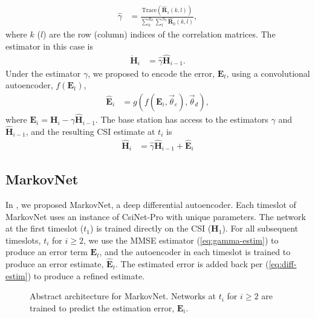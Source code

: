 \begin{align*}
	\hat \gamma &= \frac{\text{Trace}(\hat{\mathbf R}_1(k,l))}{\sum_k^{R_d}\sum_l^{N_b}\hat{\mathbf R}_0(k,l)},
\end{align*}
where $k$ ($l$) are the row (column) indices of the correlation matrices. The estimator in this case is 
\begin{align}
	\grave{\mathbf H}_i &= \hat\gamma \hat{\mathbf H}_{i-1} \label{eq:gamma-estim}.
\end{align}
Under the estimator $\gamma$, we proposed to encode the error, $\mathbf E_t$, using a convolutional autoencoder, $f(\mathbf E_t)$,
\begin{align*}
	\hat{\mathbf E}_i &= g(f(\mathbf E_i, \vec\theta_e), \vec\theta_d),
\end{align*}
where $\mathbf E_i = \mathbf H_i - \gamma\hat{\mathbf H}_{i-1}$. The base station has access to the estimators $\gamma$ and $\hat{\mathbf H}_{i-1}$, and the resulting CSI estimate at $t_i$ is
\begin{align}
	\hat{\mathbf H}_i &= \hat\gamma \hat{\mathbf H}_{i-1} + \hat{\mathbf{E}}_i \label{eq:diff-estim}
\end{align}

\subsection{MarkovNet}

In \cite{ref:Liu2020MarkovNet}, we proposed MarkovNet, a deep differential autoencoder. Each timeslot of MarkovNet uses an instance of CsiNet-Pro with unique parameters. The network at the first timeslot ($t_1$) is trained directly on the CSI ($\mathbf H_1$). For all subsequent timeslots, $t_i$ for $i \geq 2$, we use the MMSE estimator (\ref{eq:gamma-estim}) to produce an error term $\mathbf E_t$, and the autoencoder in each timeslot is trained to produce an error estimate, $\hat{\mathbf E}_t$. The estimated error is added back per (\ref{eq:diff-estim}) to produce a refined estimate.

\begin{figure}[!hbtp]
    \centering
    {
      \fontsize{6pt}{8pt}
      \def\svgwidth{0.8\columnwidth}
      
    }
    \caption{Abstract architecture for MarkovNet. Networks at $t_i$ for $i \geq 2$ are trained to predict the estimation error, $\mathbf E_i$.}
    \label{fig:markovnet_schema}
\end{figure}

